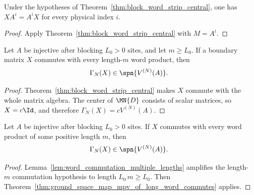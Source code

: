 \begin{lemma}
    \label{lem:boundary_matrix_commutes_long_words}
    \leanok
    Under the hypotheses of Theorem~\ref{thm:block_word_strip_central}, one has
    $X A^i = A^i X$ for every physical index $i$.
\end{lemma}

\begin{proof}
    \leanok
    Apply Theorem~\ref{thm:block_word_strip_central} with $M = A^i$.
\end{proof}

\begin{theorem}
    \label{thm:ground_space_map_mpv_of_long_word_commutes}
    \leanok
    Let $A$ be injective after blocking $L_0>0$ sites, and let $m \ge L_0$.
    If a boundary matrix $X$ commutes with every length-$m$ word product, then
    \[
        \Gamma_N(X)\in\spn\{V^{(N)}(A)\}.
    \]
\end{theorem}

\begin{proof}
    \leanok
    Theorem~\ref{thm:block_word_strip_central} makes $X$ commute with the whole
    matrix algebra. The center of $\MN{D}$ consists of scalar matrices, so
    $X=c\Id$, and therefore $\Gamma_N(X)=cV^{(N)}(A)$.
\end{proof}

\begin{theorem}
    \label{thm:ground_space_map_mpv_of_positive_word_commutes}
    \leanok
    Let $A$ be injective after blocking $L_0>0$ sites. If $X$ commutes with
    every word product of some positive length $m$, then
    \[
        \Gamma_N(X)\in\spn\{V^{(N)}(A)\}.
    \]
\end{theorem}

\begin{proof}
    \leanok
    Lemma~\ref{lem:word_commutation_multiple_lengths} amplifies the length-$m$
    commutation hypothesis to length $L_0\,m \ge L_0$. Then
    Theorem~\ref{thm:ground_space_map_mpv_of_long_word_commutes} applies.
\end{proof}

